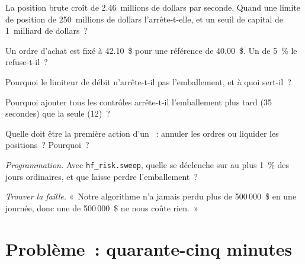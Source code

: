 \begin{exercise}[$\star$]\label{exo:hf:risk-controls:2}
La position brute croît de 2.46~millions de dollars par seconde. Quand une limite de position de 250~millions de dollars l'arrête-t-elle, et un seuil de capital de 1~milliard de dollars~?
\end{exercise}

\begin{exercise}[$\star$]\label{exo:hf:risk-controls:3}
Un ordre d'achat est fixé à 42.10~\$ pour une référence de 40.00~\$. Un  de 5~\% le refuse-t-il~?
\end{exercise}

\begin{exercise}[$\star\star$]\label{exo:hf:risk-controls:4}
Pourquoi le limiteur de débit n'arrête-t-il pas l'emballement, et à quoi sert-il~?
\end{exercise}

\begin{exercise}[$\star\star$]\label{exo:hf:risk-controls:5}
Pourquoi ajouter tous les contrôles arrête-t-il l'emballement plus tard (35 secondes) que la seule  (12)~?
\end{exercise}

\begin{exercise}[$\star\star$]\label{exo:hf:risk-controls:6}
Quelle doit être la première action d'un ~: annuler les ordres ou liquider les positions~? Pourquoi~?
\end{exercise}

\begin{exercise}[$\star\star\star$]\label{exo:hf:risk-controls:7}
\emph{Programmation.} Avec \texttt{hf\_risk.sweep}, quelle  se déclenche sur au plus 1~\% des jours ordinaires, et que laisse perdre l'emballement~?
\end{exercise}

\begin{exercise}[$\star\star\star$]\label{exo:hf:risk-controls:8}
\emph{Trouver la faille.} «~Notre algorithme n'a jamais perdu plus de 500\,000~\$ en une journée, donc une  de 500\,000~\$ ne nous coûte rien.~»
\end{exercise}

\section{Problème~: quarante-cinq minutes}


